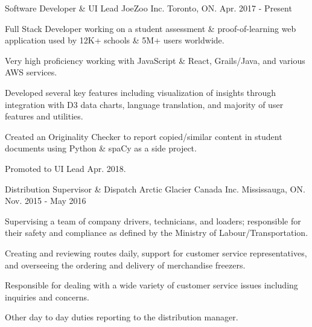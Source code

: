

\begin{cventries}

  \cventry
    {Software Developer \& UI Lead} %
    {JoeZoo Inc.} %
    {Toronto, ON.} %
    {Apr. 2017 - Present} %
    {
      \begin{cvitems} %
        \item {Full Stack Developer working on a student assessment \& proof-of-learning web application used by 12K+ schools \& 5M+ users worldwide.}
        \item {Very high proficiency working with JavaScript \& React, Grails/Java, and various AWS services.}
        \item {Developed several key features including visualization of insights through integration with D3 data charts, language translation, and majority of user features and utilities.}
        \item {Created an Originality Checker to report copied/similar content in student documents using Python \& spaCy as a side project.}
        \item {Promoted to UI Lead Apr. 2018.}
      \end{cvitems}
    }

  \cventry
    {Distribution Supervisor \& Dispatch} %
    {Arctic Glacier Canada Inc.} %
    {Mississauga, ON.} %
    {Nov. 2015 - May 2016} %
    {
      \begin{cvitems} %
        \item {Supervising a team of company drivers, technicians, and loaders; responsible for their safety and compliance as defined by the Ministry of Labour/Transportation.}
        \item {Creating and reviewing routes daily, support for customer service representatives, and overseeing the ordering and delivery of merchandise freezers.}
        \item {Responsible for dealing with a wide variety of customer service issues including inquiries and concerns.}
        \item {Other day to day duties reporting to the distribution manager.}
      \end{cvitems}
    }


\end{cventries}
